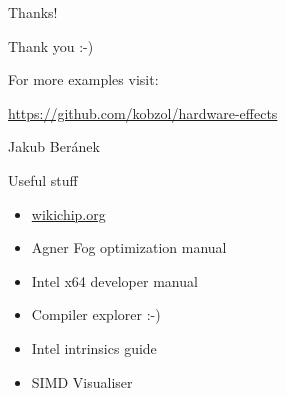 \documentclass[hyperref={pdfpagelabels=false}]{beamer}
\begin{document}
\begin{frame}[t]{Thanks!}
	\begin{center}
		{\Huge Thank you :-)}

		\vspace{10mm}
		{\Large For more examples visit:}

		{\large \url{https://github.com/kobzol/hardware-effects}}
		
		\vspace{10mm}
		{\large Jakub Beránek}
	\end{center}
\end{frame}

\begin{frame}{Useful stuff}
	\begin{itemize}
		\item \url{wikichip.org}
		\item Agner Fog optimization manual
		\item Intel x64 developer manual
		\item Compiler explorer :-)
		\item Intel intrinsics guide
		\item SIMD Visualiser
	\end{itemize}
\end{frame}
\end{document}

